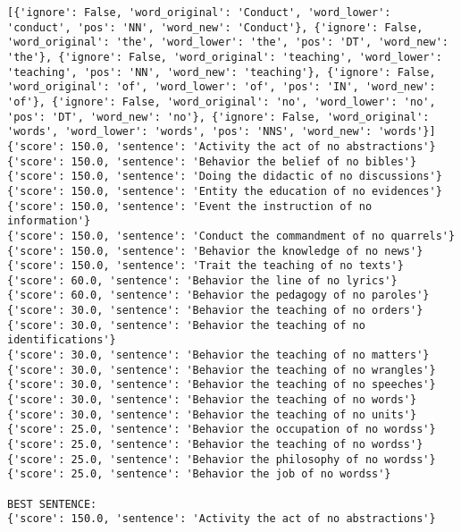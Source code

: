 \documentclass[12pt,a4paper,oneside]{book}
\begin{document}
\begin{verbatim}
[{'ignore': False, 'word_original': 'Conduct', 'word_lower': 'conduct', 'pos': 'NN', 'word_new': 'Conduct'}, {'ignore': False, 'word_original': 'the', 'word_lower': 'the', 'pos': 'DT', 'word_new': 'the'}, {'ignore': False, 'word_original': 'teaching', 'word_lower': 'teaching', 'pos': 'NN', 'word_new': 'teaching'}, {'ignore': False, 'word_original': 'of', 'word_lower': 'of', 'pos': 'IN', 'word_new': 'of'}, {'ignore': False, 'word_original': 'no', 'word_lower': 'no', 'pos': 'DT', 'word_new': 'no'}, {'ignore': False, 'word_original': 'words', 'word_lower': 'words', 'pos': 'NNS', 'word_new': 'words'}]
{'score': 150.0, 'sentence': 'Activity the act of no abstractions'}
{'score': 150.0, 'sentence': 'Behavior the belief of no bibles'}
{'score': 150.0, 'sentence': 'Doing the didactic of no discussions'}
{'score': 150.0, 'sentence': 'Entity the education of no evidences'}
{'score': 150.0, 'sentence': 'Event the instruction of no information'}
{'score': 150.0, 'sentence': 'Conduct the commandment of no quarrels'}
{'score': 150.0, 'sentence': 'Behavior the knowledge of no news'}
{'score': 150.0, 'sentence': 'Trait the teaching of no texts'}
{'score': 60.0, 'sentence': 'Behavior the line of no lyrics'}
{'score': 60.0, 'sentence': 'Behavior the pedagogy of no paroles'}
{'score': 30.0, 'sentence': 'Behavior the teaching of no orders'}
{'score': 30.0, 'sentence': 'Behavior the teaching of no identifications'}
{'score': 30.0, 'sentence': 'Behavior the teaching of no matters'}
{'score': 30.0, 'sentence': 'Behavior the teaching of no wrangles'}
{'score': 30.0, 'sentence': 'Behavior the teaching of no speeches'}
{'score': 30.0, 'sentence': 'Behavior the teaching of no words'}
{'score': 30.0, 'sentence': 'Behavior the teaching of no units'}
{'score': 25.0, 'sentence': 'Behavior the occupation of no wordss'}
{'score': 25.0, 'sentence': 'Behavior the teaching of no wordss'}
{'score': 25.0, 'sentence': 'Behavior the philosophy of no wordss'}
{'score': 25.0, 'sentence': 'Behavior the job of no wordss'}

BEST SENTENCE:
{'score': 150.0, 'sentence': 'Activity the act of no abstractions'}



\end{verbatim}
\end{document}

